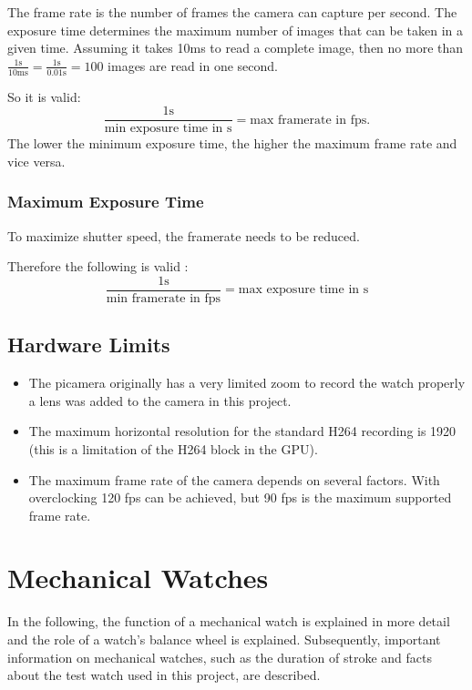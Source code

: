 \documentclass[12pt, a4paper]{report}
\begin{document}
    The frame rate is the number of frames the camera can capture per second. The exposure time determines the maximum number of images that can be taken in a given time. Assuming it takes 10ms to read a complete image, then no more than $\frac{1 \text{s} }{10 \text{ms}} = \frac{1\text{s}}{0.01\text{s}} = 100 $ images are read in one second. 
    
    \bigskip
    
    So it is valid: 
    \begin{displaymath}
    \frac{1\text{s}}{\text{min exposure time in s}} = \text{max framerate in
    fps.} 
    \end{displaymath}
    The lower the minimum exposure time, the higher the maximum frame rate and vice versa.
    
    \subsubsection{Maximum Exposure Time}
    To maximize shutter speed, the framerate needs to be reduced. 
       \newline
      
        \bigskip
    Therefore the following is valid :
    \begin{displaymath}
    \frac{1\text{s}}{\text{min framerate in fps}} = \text{max exposure time
    in s}
    \end{displaymath} 
    
    \subsection{Hardware Limits}
    
    \begin{itemize}
    \item The picamera originally has a very limited zoom to record the watch properly a lens was added to the camera in this project.
    \item The maximum horizontal resolution for the standard H264 recording is 1920 (this is a limitation of the H264 block in the GPU).
    \item The maximum frame rate of the camera depends on several factors. With overclocking 120 fps can be achieved, but 90 fps is the maximum supported frame rate.
    
    \end{itemize}
    
    \section{Mechanical Watches}  
    In the following, the function of a mechanical watch is explained in more detail and the role of a watch's balance wheel is explained. Subsequently, important information on mechanical watches, such as the duration of stroke and facts about the test watch used in this project, are described.
\end{document}
